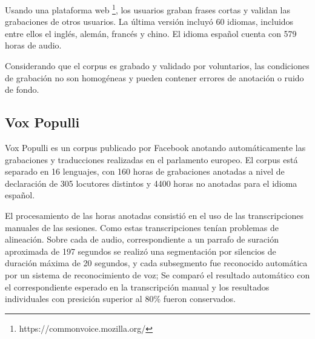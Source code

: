Usando una plataforma web \footnote{https://commonvoice.mozilla.org/}, los usuarios graban frases cortas y validan las grabaciones de otros usuarios. La última versión  incluyó 60 idiomas, incluidos entre ellos el inglés, alemán, francés y chino. El idioma español cuenta con 579 horas de audio.

Considerando que el corpus es grabado y validado por voluntarios, las condiciones de grabación no son homogéneas y pueden contener errores de anotación o ruido de fondo.

\subsection{Vox Populli}

Vox Populli \cite{voxpopulli} es un corpus publicado por Facebook anotando automáticamente las grabaciones y traducciones realizadas en el parlamento europeo. El corpus está separado en 16 lenguajes, con 160 horas de grabaciones anotadas a nivel de declaración de 305 locutores distintos y 4400 horas no anotadas para el idioma español. 

El procesamiento de las horas anotadas consistió en el uso de las transcripciones manuales de las sesiones. Como estas transcripciones tenían problemas de alineación. Sobre cada de audio, correspondiente a un parrafo de suración aproximada de 197 segundos se realizó una segmentación por silencios de duración máxima de 20 segundos, y cada subsegmento fue reconocido automática por un sistema de reconocimiento de voz; Se comparó el resultado automático con el correspondiente esperado en la transcripción manual y los resultados individuales con presición superior al 80\% fueron conservados.